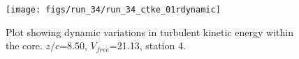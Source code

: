 \begin{figure}[H]
\centering
\texttt{[image: figs/run\_34/run\_34\_ctke\_01rdynamic]}
\caption{Plot showing dynamic variations in turbulent kinetic energy within the core. $z/c$=8.50, $V_{free}$=21.13, station 4.}
\label{fig:run_34_ctke_01rdynamic}
\end{figure}


